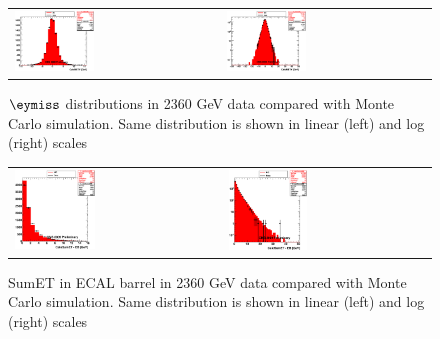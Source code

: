 \begin{figure}[h!]
 \centering
 \begin{tabular}{ll}
  \includegraphics[width=0.40\textwidth]{plots_DataVsMC_MB_2360GeV/h_calometPy_lin.eps} &
  \includegraphics[width=0.40\textwidth]{plots_DataVsMC_MB_2360GeV/h_calometPy.eps} \\
 \end{tabular}
 \caption{$\eymiss$ distributions in 2360 GeV data compared
   with Monte Carlo simulation. Same distribution is shown in linear (left) and log (right) scales
   \label{fig:DataVsMC_MB_2360_4}}
\end{figure}

\begin{figure}[h!]
 \centering
 \begin{tabular}{ll}
  \includegraphics[width=0.40\textwidth]{plots_DataVsMC_MB_2360GeV/h_caloSumetEB_lin.eps} &
  \includegraphics[width=0.40\textwidth]{plots_DataVsMC_MB_2360GeV/h_caloSumetEB.eps} \\
 \end{tabular}
\caption{SumET in ECAL barrel in 2360 GeV data compared
   with Monte Carlo simulation. Same distribution is shown in linear (left) and log (right) scales
   \label{fig:DataVsMC_MB_2360_5}}
\end{figure}


